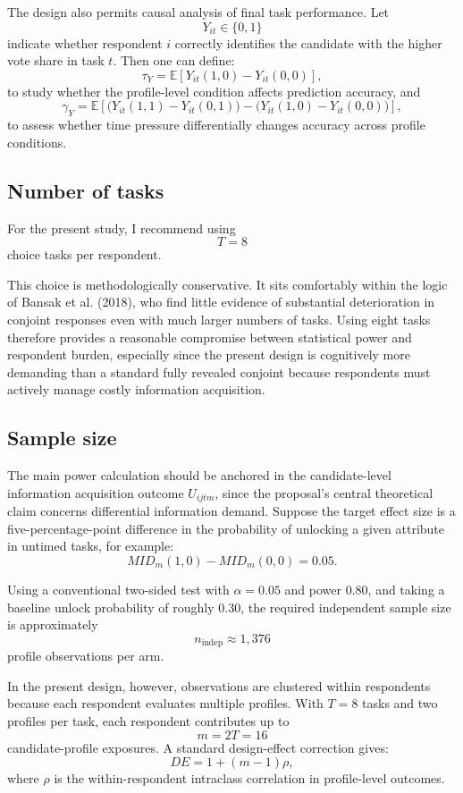 \documentclass[11pt]{article}
\begin{document}
The design also permits causal analysis of final task performance. Let
\[
Y_{it} \in \{0,1\}
\]
indicate whether respondent $i$ correctly identifies the candidate with the higher vote share in task $t$. Then one can define:
\[
\tau_Y
=
\mathbb{E}\!\left[Y_{it}(1,0) - Y_{it}(0,0)\right],
\]
to study whether the profile-level condition affects prediction accuracy, and
\[
\gamma_Y
=
\mathbb{E}\!\left[\bigl(Y_{it}(1,1)-Y_{it}(0,1)\bigr)
-
\bigl(Y_{it}(1,0)-Y_{it}(0,0)\bigr)\right],
\]
to assess whether time pressure differentially changes accuracy across profile conditions.

\subsection*{Number of tasks}

For the present study, I recommend using
\[
T = 8
\]
choice tasks per respondent.

This choice is methodologically conservative. It sits comfortably within the logic of Bansak et al. (2018), who find little evidence of substantial deterioration in conjoint responses even with much larger numbers of tasks. Using eight tasks therefore provides a reasonable compromise between statistical power and respondent burden, especially since the present design is cognitively more demanding than a standard fully revealed conjoint because respondents must actively manage costly information acquisition.

\subsection*{Sample size}

The main power calculation should be anchored in the candidate-level information acquisition outcome $U_{ijtm}$, since the proposal's central theoretical claim concerns differential information demand. Suppose the target effect size is a five-percentage-point difference in the probability of unlocking a given attribute in untimed tasks, for example:
\[
MID_m(1,0) - MID_m(0,0) = 0.05.
\]

Using a conventional two-sided test with $\alpha=0.05$ and power $0.80$, and taking a baseline unlock probability of roughly $0.30$, the required independent sample size is approximately
\[
n_{\text{indep}} \approx 1{,}376
\]
profile observations per arm.

In the present design, however, observations are clustered within respondents because each respondent evaluates multiple profiles. With $T=8$ tasks and two profiles per task, each respondent contributes up to
\[
m = 2T = 16
\]
candidate-profile exposures. A standard design-effect correction gives:
\[
DE = 1 + (m-1)\rho,
\]
where $\rho$ is the within-respondent intraclass correlation in profile-level outcomes.
\end{document}

